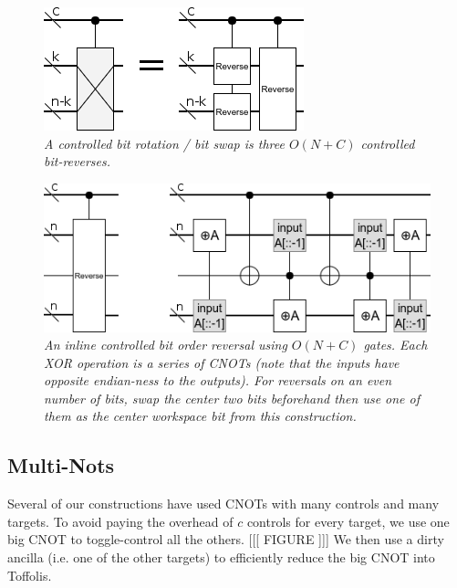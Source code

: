 \documentclass[twocolumn]{article}
\begin{document}
\begin{figure}
  \centering
  \includegraphics[width=\linewidth]{assets/controlled-bit-rotate.png}
  \caption{\em
    A controlled bit rotation / bit swap is three $O(N+C)$ controlled bit-reverses.
  }
  \label{fig:dependencies}
\end{figure}

\begin{figure}
  \centering
  \includegraphics[width=\linewidth]{assets/controlled-reverse.png}
  \caption{\em
    An inline controlled bit order reversal using $O(N + C)$ gates.
    Each XOR operation is a series of CNOTs (note that the inputs have opposite endian-ness to the outputs).
    For reversals on an even number of bits, swap the center two bits beforehand then use one of them as the center workspace bit from this construction.
  }
  \label{fig:dependencies}
\end{figure}


\subsection{Multi-Nots}

Several of our constructions have used CNOTs with many controls and many targets.
To avoid paying the overhead of $c$ controls for every target, we use one big CNOT to toggle-control all the others. [[[ FIGURE ]]]
We then use a dirty ancilla (i.e. one of the other targets) to efficiently reduce the big CNOT into Toffolis.
\end{document}

